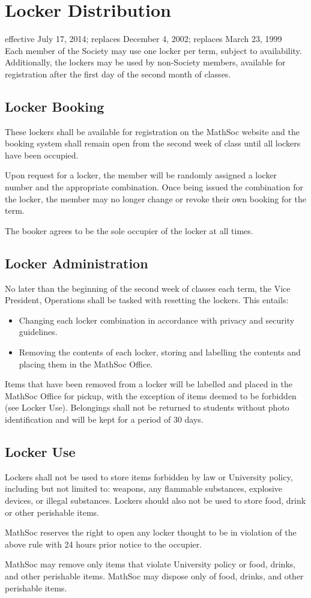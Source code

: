 \section{Locker Distribution}
effective July 17, 2014; replaces December 4, 2002; replaces March 23, 1999\\

Each member of the Society may use one locker per term, subject to
availability. Additionally, the lockers may be used by non-Society members,
available for registration after the first day of the second month of classes.

\subsection{Locker Booking}
These lockers shall be available for registration on the MathSoc website and
the booking system shall remain open from the second week of class until all
lockers have been occupied.

Upon request for a locker, the member will be randomly assigned a locker
number and the appropriate combination. Once being issued the combination for
the locker, the member may no longer change or revoke their own booking for
the term.

The booker agrees to be the sole occupier of the locker at all times.

\subsection{Locker Administration}
No later than the beginning of the second week of classes each term, the Vice
President, Operations shall be tasked with resetting the lockers. This entails:
\begin{itemize}
\item Changing each locker combination in accordance with privacy and security
guidelines.
\item Removing the contents of each locker, storing and labelling the contents
and placing them in the MathSoc Office.
\end{itemize}
Items that have been removed from a locker will be labelled and placed in the
MathSoc Office for pickup, with the exception of items deemed to be forbidden
(see Locker Use). Belongings shall not be returned to students without photo
identification and will be kept for a period of 30 days.

\subsection{Locker Use}
Lockers shall not be used to store items forbidden by law or University
policy, including but not limited to: weapons, any flammable substances,
explosive devices, or illegal substances. Lockers should also not be used to
store food, drink or other perishable items.

MathSoc reserves the right to open any locker thought to be in violation of
the above rule with 24 hours prior notice to the occupier.

MathSoc may remove only items that violate University policy or food, drinks,
and other perishable items. MathSoc may dispose only of food, drinks, and
other perishable items.
